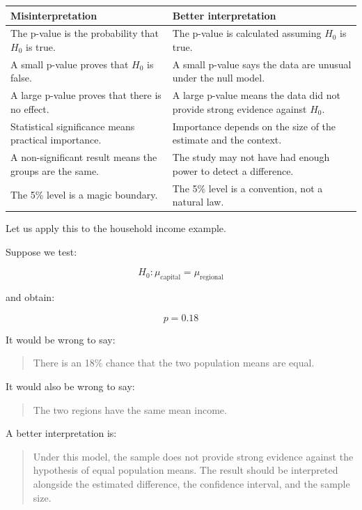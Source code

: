 \documentclass[
  letterpaper,
  DIV=11,
  numbers=noendperiod]{scrreprt}
\begin{document}
\begin{table}
\fontsize{12.0pt}{14.0pt}\selectfont
\begin{tabular*}{\linewidth}{@{\extracolsep{\fill}}ll}
\toprule
Misinterpretation & Better interpretation \\ 
\midrule\addlinespace[2.5pt]
The p-value is the probability that \(H_0\) is true. & The p-value is calculated assuming \(H_0\) is true. \\ 
A small p-value proves that \(H_0\) is false. & A small p-value says the data are unusual under the null model. \\ 
A large p-value proves that there is no effect. & A large p-value means the data did not provide strong evidence against \(H_0\). \\ 
Statistical significance means practical importance. & Importance depends on the size of the estimate and the context. \\ 
A non-significant result means the groups are the same. & The study may not have had enough power to detect a difference. \\ 
The 5\% level is a magic boundary. & The 5\% level is a convention, not a natural law. \\ 
\bottomrule
\end{tabular*}
\end{table}

Let us apply this to the household income example.

Suppose we test:

\[
H_0: \mu_{\text{capital}} = \mu_{\text{regional}}
\]

and obtain:

\[
p = 0.18
\]

It would be wrong to say:

\begin{quote}
There is an 18\% chance that the two population means are equal.
\end{quote}

It would also be wrong to say:

\begin{quote}
The two regions have the same mean income.
\end{quote}

A better interpretation is:

\begin{quote}
Under this model, the sample does not provide strong evidence against
the hypothesis of equal population means. The result should be
interpreted alongside the estimated difference, the confidence interval,
and the sample size.
\end{quote}
\end{document}
